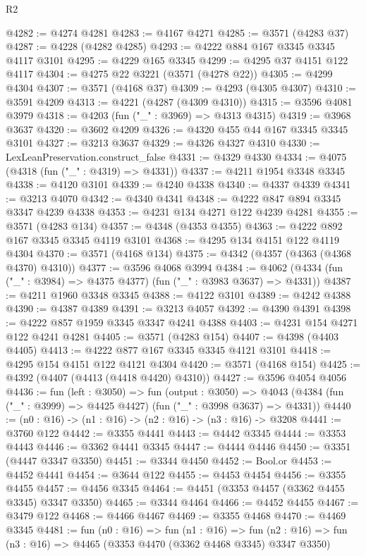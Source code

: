\begin{lexlean}{R2}
\begin{coremodule}
@4282 := @4274 @4281
@4283 := @4167 @4271
@4285 := @3571 (@4283 @37)
@4287 := @4228 (@4282 @4285)
@4293 := @4222 @884 @167 @3345 @3345 @4117 @3101
@4295 := @4229 @165 @3345
@4299 := @4295 @37 @4151 @122 @4117
@4304 := @4275 @22 @3221 (@3571 (@4278 @22))
@4305 := @4299 @4304
@4307 := @3571 (@4168 @37)
@4309 := @4293 (@4305 @4307)
@4310 := @3591 @4209
@4313 := @4221 (@4287 (@4309 @4310))
@4315 := @3596 @4081 @3979
@4318 := @4203 (fun ("_" : @3969) => @4313 @4315)
@4319 := @3968 @3637
@4320 := @3602 @4209
@4326 := @4320 @455 @44 @167 @3345 @3345 @3101
@4327 := @3213 @3637
@4329 := @4326 @4327 @4310
@4330 := LexLeanPreservation.construct_false
@4331 := @4329 @4330
@4334 := @4075 (@4318 (fun ("_" : @4319) => @4331))
@4337 := @4211 @1954 @3348 @3345
@4338 := @4120 @3101
@4339 := @4240 @4338
@4340 := @4337 @4339
@4341 := @3213 @4070
@4342 := @4340 @4341
@4348 := @4222 @847 @894 @3345 @3347 @4239 @4338
@4353 := @4231 @134 @4271 @122 @4239 @4281
@4355 := @3571 (@4283 @134)
@4357 := @4348 (@4353 @4355)
@4363 := @4222 @892 @167 @3345 @3345 @4119 @3101
@4368 := @4295 @134 @4151 @122 @4119 @4304
@4370 := @3571 (@4168 @134)
@4375 := @4342 (@4357 (@4363 (@4368 @4370) @4310))
@4377 := @3596 @4068 @3994
@4384 := @4062 (@4334 (fun ("_" : @3984) => @4375 @4377) (fun ("_" : @3983 @3637) => @4331))
@4387 := @4211 @1960 @3348 @3345
@4388 := @4122 @3101
@4389 := @4242 @4388
@4390 := @4387 @4389
@4391 := @3213 @4057
@4392 := @4390 @4391
@4398 := @4222 @857 @1959 @3345 @3347 @4241 @4388
@4403 := @4231 @154 @4271 @122 @4241 @4281
@4405 := @3571 (@4283 @154)
@4407 := @4398 (@4403 @4405)
@4413 := @4222 @877 @167 @3345 @3345 @4121 @3101
@4418 := @4295 @154 @4151 @122 @4121 @4304
@4420 := @3571 (@4168 @154)
@4425 := @4392 (@4407 (@4413 (@4418 @4420) @4310))
@4427 := @3596 @4054 @4056
@4436 := fun (left : @3050) =>
  fun (output : @3050) =>
  @4043 (@4384 (fun ("_" : @3999) => @4425 @4427) (fun ("_" : @3998 @3637) => @4331))
@4440 := (n0 : @16) -> (n1 : @16) -> (n2 : @16) -> (n3 : @16) -> @3208
@4441 := @3760 @122
@4442 := @3355 @4441
@4443 := @4442 @3345
@4444 := @3353 @4443
@4446 := @3362 @4441 @3345
@4447 := @4444 @4446
@4450 := @3351 (@4447 @3347 @3350)
@4451 := @3344 @4450
@4452 := Bool.or
@4453 := @4452 @4441
@4454 := @3644 @122
@4455 := @4453 @4454
@4456 := @3355 @4455
@4457 := @4456 @3345
@4464 := @4451 (@3353 @4457 (@3362 @4455 @3345) @3347 @3350)
@4465 := @3344 @4464
@4466 := @4452 @4455
@4467 := @3479 @122
@4468 := @4466 @4467
@4469 := @3355 @4468
@4470 := @4469 @3345
@4481 := fun (n0 : @16) =>
  fun (n1 : @16) =>
  fun (n2 : @16) => fun (n3 : @16) => @4465 (@3353 @4470 (@3362 @4468 @3345) @3347 @3350)

\end{coremodule}
\end{lexlean}
